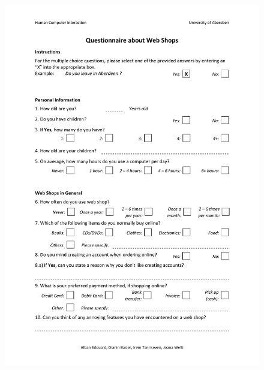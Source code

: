 \begin{figure}[t]
\centering
\includegraphics[width=1.0\textwidth]{User_Involvement_Methods/Questionnaires/Questionnaire_Web_Shops_v3.pdf}
\end{figure}

